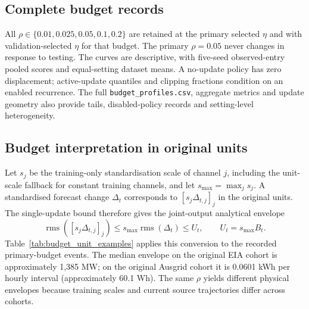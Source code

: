 \documentclass[11pt,a4paper]{article}
\newcommand{\rms}{\operatorname{rms}}
\begin{document}
\subsection{Complete budget records}
All $\rho\in\{0.01,0.025,0.05,0.1,0.2\}$ are retained at the primary selected $\eta$ and with validation-selected $\eta$ for that budget. The primary $\rho=0.05$ never changes in response to testing. The curves are descriptive, with five-seed observed-entry pooled scores and equal-setting dataset means. A no-update policy has zero displacement; active-update quantiles and clipping fractions condition on an enabled recurrence. The full \texttt{budget\_profiles.csv}, aggregate metrics and update geometry also provide tails, disabled-policy records and setting-level heterogeneity.

\subsection{Budget interpretation in original units}
Let $s_j$ be the training-only standardisation scale of channel $j$, including the unit-scale fallback for constant training channels, and let $s_{\max}=\max_j s_j$. A standardised forecast change $\Delta_t$ corresponds to $[s_j\Delta_{t,j}]_j$ in the original units. The single-update bound therefore gives the joint-output analytical envelope
\[
 \rms([s_j\Delta_{t,j}]_j)\leq s_{\max}\rms(\Delta_t)
 \leq U_t,\qquad U_t=s_{\max}B_t.
\]
Table~\ref{tab:budget_unit_examples} applies this conversion to the recorded primary-budget events. The median envelope on the original EIA cohort is approximately 1,385 MW; on the original Ausgrid cohort it is 0.0601 kWh per hourly interval (approximately 60.1 Wh). The same $\rho$ yields different physical envelopes because training scales and current source trajectories differ across cohorts.

\begin{table}[htbp]
\centering\footnotesize
\caption{Analytical original-unit envelopes for the primary $\rho=0.05$ budget. $s_{\max}$ is the largest training scaling coefficient; $B_t$ is standardised and $U_t=s_{\max}B_t$ uses the stated original unit. Medians and P99 values pool all active QUART events within each cohort across horizons, sources and seeds. They describe the analytical envelopes, not measured physical-unit displacement. Disabled policies contribute no update events.}
\label{tab:budget_unit_examples}

\end{table}
\end{document}
